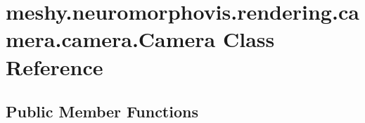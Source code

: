 \hypertarget{classmeshy_1_1neuromorphovis_1_1rendering_1_1camera_1_1camera_1_1Camera}{}\section{meshy.\+neuromorphovis.\+rendering.\+camera.\+camera.\+Camera Class Reference}
\label{classmeshy_1_1neuromorphovis_1_1rendering_1_1camera_1_1camera_1_1Camera}


 


\subsection*{Public Member Functions}
